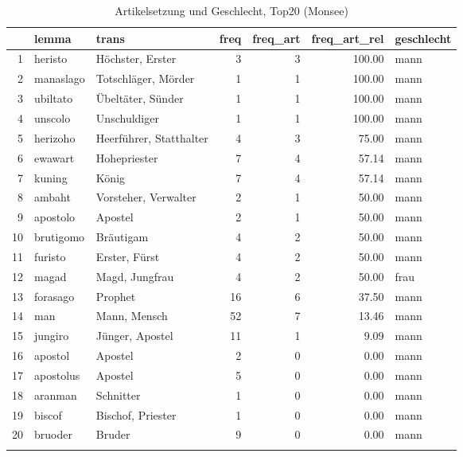 \begin{table}[ht]
\centering
\begin{tabular}{rllrrrl}
  \lsptoprule
 & lemma & trans & freq & freq\_art & freq\_art\_rel & geschlecht \\ 
  \midrule
1 & heristo & Höchster, Erster &   3 &   3 & 100.00 & mann \\ 
  2 & manaslago & Totschläger, Mörder &   1 &   1 & 100.00 & mann \\ 
  3 & ubiltato & Übeltäter, Sünder &   1 &   1 & 100.00 & mann \\ 
  4 & unscolo & Unschuldiger &   1 &   1 & 100.00 & mann \\ 
  5 & herizoho & Heerführer, Statthalter &   4 &   3 & 75.00 & mann \\ 
  6 & ewawart & Hohepriester &   7 &   4 & 57.14 & mann \\ 
  7 & kuning & König &   7 &   4 & 57.14 & mann \\ 
  8 & ambaht & Vorsteher, Verwalter &   2 &   1 & 50.00 & mann \\ 
  9 & apostolo & Apostel &   2 &   1 & 50.00 & mann \\ 
  10 & brutigomo & Bräutigam &   4 &   2 & 50.00 & mann \\ 
  11 & furisto & Erster, Fürst &   4 &   2 & 50.00 & mann \\ 
  12 & magad & Magd, Jungfrau &   4 &   2 & 50.00 & frau \\ 
  13 & forasago & Prophet &  16 &   6 & 37.50 & mann \\ 
  14 & man & Mann, Mensch &  52 &   7 & 13.46 & mann \\ 
  15 & jungiro & Jünger, Apostel &  11 &   1 & 9.09 & mann \\ 
  16 & apostol & Apostel &   2 &   0 & 0.00 & mann \\ 
  17 & apostolus & Apostel &   5 &   0 & 0.00 & mann \\ 
  18 & aranman & Schnitter &   1 &   0 & 0.00 & mann \\ 
  19 & biscof & Bischof, Priester &   1 &   0 & 0.00 & mann \\ 
  20 & bruoder & Bruder &   9 &   0 & 0.00 & mann \\ 
   \lspbottomrule
\end{tabular}
\caption{Artikelsetzung und Geschlecht, Top20  (Monsee)} 
\end{table}
